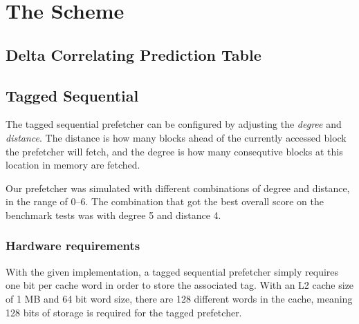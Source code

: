 \section{The Scheme}


\subsection{Delta Correlating Prediction Table}

\subsection{Tagged Sequential}

The tagged sequential prefetcher can be configured by adjusting the
\emph{degree} and \emph{distance}. The distance is how many blocks ahead of the
currently accessed block the prefetcher will fetch, and the degree is how many
consequtive blocks at this location in memory are fetched.

Our prefetcher was simulated with different combinations of degree and distance,
in the range of 0--6. The combination that got the best overall score on the
benchmark tests was with degree 5 and distance 4.

\subsubsection{Hardware requirements}

With the given implementation, a tagged sequential prefetcher simply requires
one bit per cache word in order to store the associated tag. With an L2 cache
size of 1 MB and 64 bit word size, there are 128 different words in the cache,
meaning 128 bits of storage is required for the tagged prefetcher.

